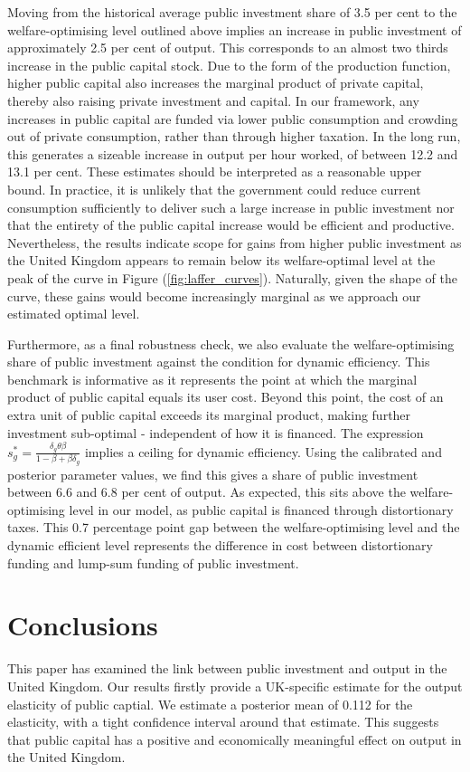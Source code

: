 \documentclass[titlepage, 11pt, a4paper]{article}
\renewcommand{\&}{and}
\begin{document}
Moving from the historical average public investment share of 3.5 per cent to the welfare-optimising level outlined above implies an increase in public investment of approximately 2.5 per cent of output. This corresponds to an almost two thirds increase in the public capital stock. Due to the form of the production function, higher public capital also increases the marginal product of private capital, thereby also raising private investment and capital.
In our framework, any increases in public capital are funded via lower public consumption and crowding out of private consumption, rather than through higher taxation. In the long run, this generates a sizeable increase in output per hour worked, of between 12.2 and 13.1 per cent. These estimates should be interpreted as a reasonable upper bound. 
In practice, it is unlikely that the government could reduce current consumption sufficiently to deliver such a large increase in public investment nor that the entirety of the public capital increase would be efficient and productive. Nevertheless, the results indicate scope for gains from higher public investment as the United Kingdom appears to remain below its welfare-optimal level at the peak of the curve in Figure (\ref{fig:laffer_curves}). Naturally, given the shape of the curve, these gains would become increasingly marginal as we approach our estimated optimal level.



Furthermore, as a final robustness check, we also evaluate the welfare-optimising share of public investment against the condition for dynamic efficiency. This benchmark is informative as it represents the point at which the marginal product of public capital equals its user cost. Beyond this point, the cost of an extra unit of public capital exceeds its marginal product, making further investment sub-optimal - independent of how it is financed. 
The expression $ s_g^*=\frac{\delta_g\theta\beta}{1-\beta+\beta\delta_g}$ implies a ceiling for dynamic efficiency. Using the calibrated and posterior parameter values, we find this gives a share of public investment between 6.6 and 6.8 per cent of output. As expected, this sits above the welfare-optimising level in our model, as public capital is financed through distortionary taxes. This 0.7 percentage point gap between the welfare-optimising level and the dynamic efficient level represents the difference in cost between distortionary funding and lump-sum funding of public investment.


\section{Conclusions} \label{conclusion}
This paper has examined the link between public investment and output in the United Kingdom. Our results firstly provide a UK-specific estimate for the output elasticity of public captial. We estimate a posterior mean of 0.112 for the elasticity, with a tight confidence interval around that estimate. This suggests that public capital has a positive and economically meaningful effect on output in the United Kingdom. 
\end{document}
